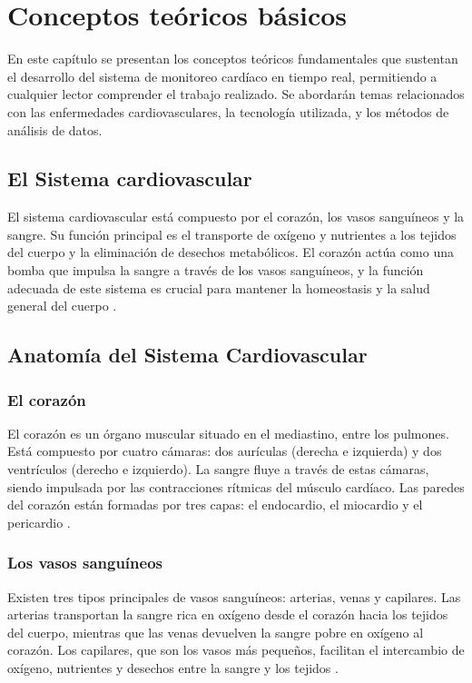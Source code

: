 
\section{Conceptos teóricos básicos}

En este capítulo se presentan los conceptos teóricos fundamentales que sustentan el desarrollo del sistema de monitoreo cardíaco en tiempo real, permitiendo a cualquier lector comprender el trabajo realizado. Se abordarán temas relacionados con las enfermedades cardiovasculares, la tecnología utilizada, y los métodos de análisis de datos.

\subsection{El Sistema cardiovascular}

El sistema cardiovascular está compuesto por el corazón, los vasos sanguíneos y la sangre. Su función principal es el transporte de oxígeno y nutrientes a los tejidos del cuerpo y la eliminación de desechos metabólicos. El corazón actúa como una bomba que impulsa la sangre a través de los vasos sanguíneos, y la función adecuada de este sistema es crucial para mantener la homeostasis y la salud general del cuerpo \cite{guyton2006text}.

\subsection{Anatomía del Sistema Cardiovascular}

\subsubsection{El corazón}
El corazón es un órgano muscular situado en el mediastino, entre los pulmones. Está compuesto por cuatro cámaras: dos aurículas (derecha e izquierda) y dos ventrículos (derecho e izquierdo). La sangre fluye a través de estas cámaras, siendo impulsada por las contracciones rítmicas del músculo cardíaco. Las paredes del corazón están formadas por tres capas: el endocardio, el miocardio y el pericardio \cite{sistema_cardiovascular}.

\subsubsection{Los vasos sanguíneos}
Existen tres tipos principales de vasos sanguíneos: arterias, venas y capilares. Las arterias transportan la sangre rica en oxígeno desde el corazón hacia los tejidos del cuerpo, mientras que las venas devuelven la sangre pobre en oxígeno al corazón. Los capilares, que son los vasos más pequeños, facilitan el intercambio de oxígeno, nutrientes y desechos entre la sangre y los tejidos \cite{sistema_cardiovascular}.

